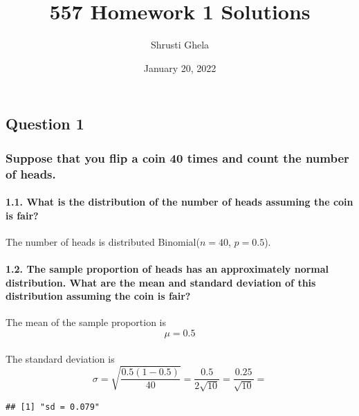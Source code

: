 \documentclass[
]{article}
\title{557 Homework 1 Solutions}
\author{Shrusti Ghela}
\date{January 20, 2022}
\begin{document}
\maketitle

\hypertarget{question-1}{%
\subsection{Question 1}\label{question-1}}

\hypertarget{suppose-that-you-flip-a-coin-40-times-and-count-the-number-of-heads.}{%
\subsubsection{Suppose that you flip a coin 40 times and count the
number of
heads.}\label{suppose-that-you-flip-a-coin-40-times-and-count-the-number-of-heads.}}

\hypertarget{what-is-the-distribution-of-the-number-of-heads-assuming-the-coin-is-fair}{%
\paragraph{1.1. What is the distribution of the number of heads assuming
the coin is
fair?}\label{what-is-the-distribution-of-the-number-of-heads-assuming-the-coin-is-fair}}

The number of heads is distributed Binomial(\(n = 40\), \(p = 0.5\)).

\hypertarget{the-sample-proportion-of-heads-has-an-approximately-normal-distribution.-what-are-the-mean-and-standard-deviation-of-this-distribution-assuming-the-coin-is-fair}{%
\paragraph{1.2. The sample proportion of heads has an approximately
normal distribution. What are the mean and standard deviation of this
distribution assuming the coin is
fair?}\label{the-sample-proportion-of-heads-has-an-approximately-normal-distribution.-what-are-the-mean-and-standard-deviation-of-this-distribution-assuming-the-coin-is-fair}}

The mean of the sample proportion is \[ \mu = 0.5\]\\
The standard deviation is
\[\sigma = \sqrt{\frac{0.5(1 - 0.5)}{40}} = \frac{0.5}{2\sqrt{10}} = \frac{0.25}{\sqrt{10}}=\]

\begin{verbatim}
## [1] "sd = 0.079"
\end{verbatim}
\end{document}
